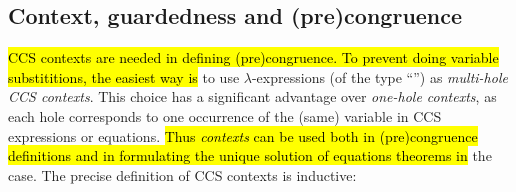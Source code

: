 
\subsection{Context, guardedness and (pre)congruence}
\label{ss:context}

\hl{CCS contexts are needed in defining (pre)congruence.
To prevent doing variable substititions, the easiest way is}
to use \univariate $\lambda$-expressions (of the type
``'') as \emph{multi-hole CCS contexts}.
%
This choice has a significant advantage over \emph{one-hole
contexts}, as each hole corresponds to one occurrence of the (same)
variable in \univariate CCS expressions or equations.
\hl{Thus \emph{contexts} can be used both in (pre)congruence definitions
and in formulating the unique solution of equations theorems in}
the \univariate case. The precise definition of CCS contexts is inductive:
